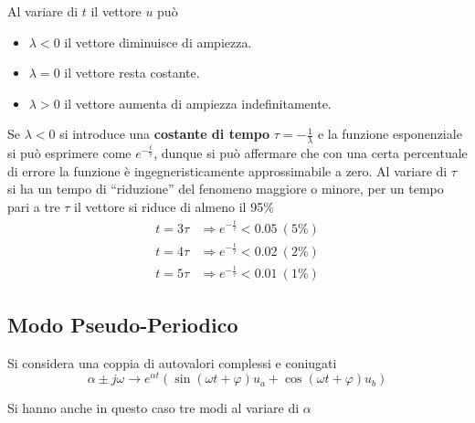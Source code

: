 Al variare di $t$ il vettore $u$ può
\begin{itemize}
\item $\lambda<0$ il vettore diminuisce di ampiezza.
\item $\lambda=0$ il vettore resta costante.
\item $\lambda>0$ il
vettore aumenta di ampiezza indefinitamente.
\end{itemize}

Se $\lambda<0$ si introduce una \textbf{costante di tempo} $\tau =
-\frac{1}{\lambda}$
e la funzione esponenziale si può esprimere come
$e^{-\frac{t}{\tau}}$, dunque si può affermare che con una certa percentuale di
errore la funzione è ingegneristicamente approssimabile a zero.
Al variare di $\tau$ si ha un tempo di ``riduzione'' del fenomeno maggiore o
minore, per un tempo pari a tre $\tau$ il vettore si riduce di almeno il 95\%
$$\begin{aligned}
t=3\tau&\Rightarrow e^{-\frac{t}{\tau}}
< 0.05\ (5\%)\\
t=4\tau&\Rightarrow e^{-\frac{t}{\tau}}
< 0.02\ (2\%)\\
t=5\tau&\Rightarrow e^{-\frac{t}{\tau}}
< 0.01\ (1\%)
\end{aligned}$$

\newpage
\subsection{Modo Pseudo-Periodico}
Si considera una coppia di autovalori complessi e coniugati
$$
\alpha \pm j\omega \rightarrow e^{\alpha t}\left(\sin(\omega t + \varphi)u_a +
\cos(\omega t + \varphi)u_b\right)
$$

Si hanno anche in questo caso tre modi al variare di $\alpha$

